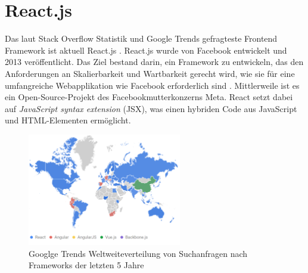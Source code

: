 \section{React.js}
Das laut Stack Overflow Statistik und Google Trends gefragteste Frontend Framework ist aktuell React.js \cite{googleTrends} \cite{stackoverflowStats}.
React.js wurde von Facebook entwickelt und 2013 veröffentlicht.
Das Ziel bestand darin, ein Framework zu entwickeln,
das den Anforderungen an Skalierbarkeit und Wartbarkeit gerecht wird,
wie sie für eine umfangreiche Webapplikation wie Facebook erforderlich sind \cite[S. 1]{gackenheimer2015introduction}.
Mittlerweile ist es ein Open-Source-Projekt des Facebookmutterkonzerns Meta.
React setzt dabei auf \emph{JavaScript syntax extension} (JSX), was einen hybriden Code aus JavaScript und HTML-Elementen ermöglicht. \cite{react}


\begin{figure}[!htb]
    \centering
    \includegraphics[width=0.6\textwidth]{img/Google Stats/2023-04-26 12_20_26-React, Angular, AngularJS, Vue.js, Backbone.js - Erkunden - Google Trends}
    \caption{Googlge Trends Weltweiteverteilung von Suchanfragen nach Frameworks der letzten 5 Jahre \cite{googleTrends}}
    \label{fig:google_trends_world}
\end{figure}
